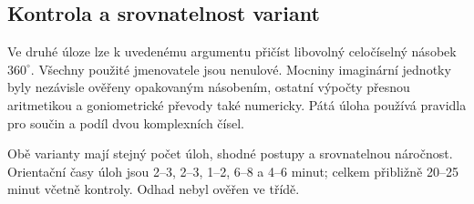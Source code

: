\documentclass[a4paper,10pt]{article}
\begin{document}
\subsection*{Kontrola a srovnatelnost variant}
Ve druhé úloze lze k uvedenému argumentu přičíst libovolný celočíselný
násobek $360^\circ$. Všechny použité jmenovatele jsou nenulové.
Mocniny imaginární jednotky byly nezávisle ověřeny opakovaným násobením,
ostatní výpočty přesnou aritmetikou a goniometrické převody také numericky.
Pátá úloha používá pravidla pro součin a podíl dvou komplexních čísel.

Obě varianty mají stejný počet úloh, shodné postupy a srovnatelnou náročnost.
Orientační časy úloh jsou 2--3, 2--3, 1--2, 6--8 a 4--6 minut;
celkem přibližně 20--25 minut včetně kontroly. Odhad nebyl ověřen ve třídě.
\end{document}
